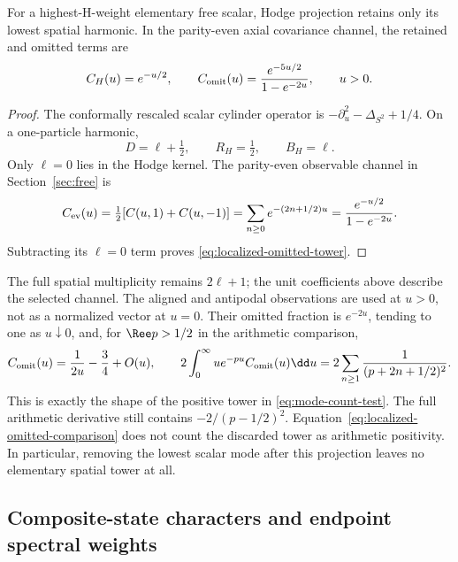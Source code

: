 \begin{proposition}
\label{prop:localized-hodge-loss}
For a highest-H-weight elementary free scalar, Hodge projection
retains only its lowest spatial harmonic. In the parity-even axial
covariance channel, the retained and omitted terms are
\begin{equation}\label{eq:localized-omitted-tower}
 C_H(u)=e^{-u/2},\qquad
 C_{\rm omit}(u)=\frac{e^{-5u/2}}{1-e^{-2u}},\qquad u>0.
\end{equation}
\end{proposition}
\begin{proof}
The conformally rescaled scalar cylinder operator is
$-\partial_u^2-\Delta_{S^2}+1/4$. On a one-particle harmonic,
\[
 D=\ell+\tfrac12,\qquad R_H=\tfrac12,\qquad B_H=\ell.
\]
Only $\ell=0$ lies in the Hodge kernel. The parity-even observable
channel in Section~\ref{sec:free} is
\[
 C_{\rm ev}(u)=\tfrac12[C(u,1)+C(u,-1)]
 =\sum_{n\geq0}e^{-(2n+1/2)u}
 =\frac{e^{-u/2}}{1-e^{-2u}}.
\]
Subtracting its $\ell=0$ term proves
\eqref{eq:localized-omitted-tower}.
\end{proof}
The full spatial multiplicity remains $2\ell+1$; the unit coefficients
above describe the selected channel. The aligned and antipodal
observations are used at $u>0$, not as a normalized vector at $u=0$.
Their omitted fraction is $e^{-2u}$, tending to one as $u\downarrow0$,
and, for $\Ree p>1/2$ in the arithmetic comparison,
\begin{equation}\label{eq:localized-omitted-comparison}
 C_{\rm omit}(u)=\frac1{2u}-\frac34+O(u),\qquad
 2\int_0^\infty ue^{-pu}C_{\rm omit}(u)\dd u
 =2\sum_{n\geq1}\frac1{(p+2n+1/2)^2}.
\end{equation}
This is exactly the shape of the positive tower in
\eqref{eq:mode-count-test}. The full arithmetic derivative still
contains $-2/(p-1/2)^2$. Equation~\eqref{eq:localized-omitted-comparison}
does not count the discarded tower as arithmetic positivity.
In particular, removing the lowest scalar mode after this projection
leaves no elementary spatial tower at all.

\subsection{Composite-state characters and endpoint spectral weights}
\label{subsec:localized-character}

